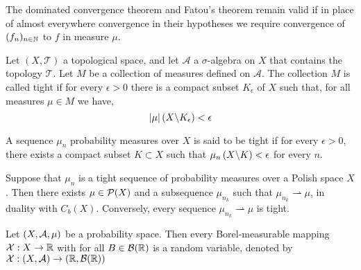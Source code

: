 \begin{corollary}
The dominated convergence theorem and Fatou’s theorem remain valid if in place of almost everywhere convergence in their hypotheses we require convergence of $(f_n)_{n\in \mathbb{N}}$ to $f$ in measure $\mu$.
\end{corollary}



\begin{definition}[Tightness] Let $(X, \mathcal T)$ a topological space, and let $\mathcal A$ a $\sigma$-algebra on $X$ that contains the topology $\mathcal{T}$. Let $M$ be a collection of measures defined on $\mathcal{A}$. The collection $M$ is called tight  if for every $\epsilon>0$ there is a compact subset $K_\epsilon$ of $X$ such that, for all measures $\mu\in M$ we have,
	\begin{equation*}
	\left| \mu \right|\left( X \backslash K_\epsilon \right) < \epsilon
	\end{equation*} 
\end{definition}


\begin{definition}
	A sequence $\mu_n$ probability measures over $X$ is said to be tight if for every $\epsilon> 0$, there exists a compact subset $K\subset X$ such that $\mu_n\left( X\backslash K \right)< \epsilon$ for every $n$.
\end{definition}


\begin{theorem}[Prokhorov]
	Suppose that $\mu_n $ is a tight sequence of probability measures over a Polish space $X$. Then there exists $\mu\in\mathcal{P}(X)$ and a subsequence $\mu_{n_k}$ such that $\mu_{n_k}\rightharpoonup \mu $, in duality with $C_b(X)$. Conversely, every sequence $\mu_{n_k}\rightharpoonup \mu$ is tight.
\end{theorem}

\begin{definition}
	Let $\left( X, \mathcal A, \mu \right)$ be a probability space. Then every Borel-measurable mapping $\mathcal{X}: X\rightarrow \mathbb{R}$ with for all $B\in \mathcal B(\mathbb{R}) $ is a random variable, denoted by $\mathcal{X}: \left( X, \mathcal A \right)\rightarrow \left( \mathbb{R}, \mathcal B (\mathbb{R}) \right) $
\end{definition}

\begin{definition}
		
\end{definition}


